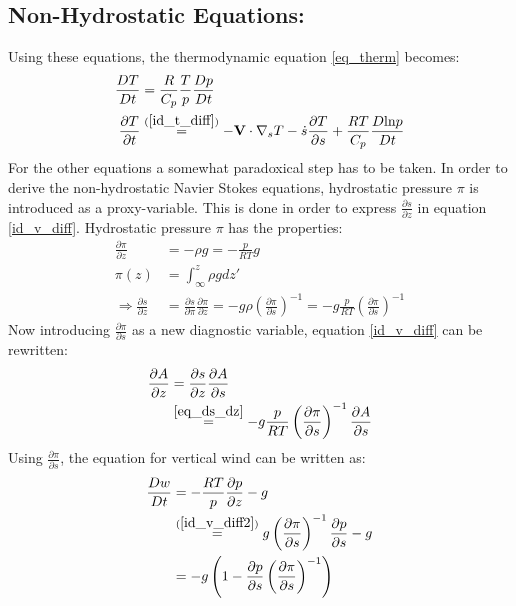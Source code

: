 \subsection{Non-Hydrostatic Equations:}\label{sec:non_hydrostatic}
Using these equations, the thermodynamic equation \ref{eq_therm} becomes:
\begin{align*}
\frac{DT}{Dt} &= \frac{R}{C_p}\frac{T}{p}\frac{Dp}{Dt}\\
\frac{\partial T}{\partial t} &\stackrel{(\ref{id_t_diff})}{=} -\textbf{V} \cdot \nabla _s T - \dot{s} \frac{\partial T}{\partial s}+\frac{RT}{C_p}\frac{D\text{ln}p}{Dt}
\end{align*}
For the other equations a somewhat paradoxical step has to be taken.
In order to derive the non-hydrostatic Navier Stokes equations, hydrostatic pressure $\pi$ is introduced as a proxy-variable.
This is done in order to express $\frac{\partial s}{\partial z}$ in equation \ref{id_v_diff}.
Hydrostatic pressure $\pi$ has the properties:
\begin{align}
\frac{\partial \pi}{\partial z} &= -\rho g = - \frac{p}{RT}g \nonumber \\
\pi(z) &= \int_\infty ^z \rho g dz' \nonumber \\
\Rightarrow \frac{\partial s}{\partial z} &= \frac{\partial s}{\partial \pi}\frac{\partial \pi}{\partial z} = - g\rho\left(\frac{\partial \pi}{\partial s}\right)^{-1} = - g\frac{p}{RT}\left(\frac{\partial \pi}{\partial s}\right)^{-1} \label{eq_ds_dz}
\end{align}
Now introducing $\frac{\partial \pi}{\partial s}$ as a new diagnostic variable, equation \ref{id_v_diff} can be rewritten:
\begin{align}
\frac{\partial A}{\partial z} &= \frac{\partial s}{\partial z} \frac{\partial A}{\partial s}\nonumber\\
&\stackrel{\ref{eq_ds_dz}}{=} - g\frac{p}{RT}\left(\frac{\partial \pi}{\partial s}\right)^{-1}\frac{\partial A}{\partial s}\label{id_v_diff2}
\end{align}
Using $\frac{\partial \pi}{\partial s}$, the equation for vertical wind can be written as:
\begin{align*}
\frac{Dw}{Dt} &= - \frac{RT}{p} \frac{\partial p}{\partial z} - g\\
&\stackrel{(\ref{id_v_diff2})}{=} g \left(\frac{\partial \pi}{\partial s}\right)^{-1}\frac{\partial p}{\partial s} - g\\
&= -g\left(1 - \frac{\partial p}{\partial s}\left(\frac{\partial \pi}{\partial s}\right)^{-1}\right)
\end{align*}
